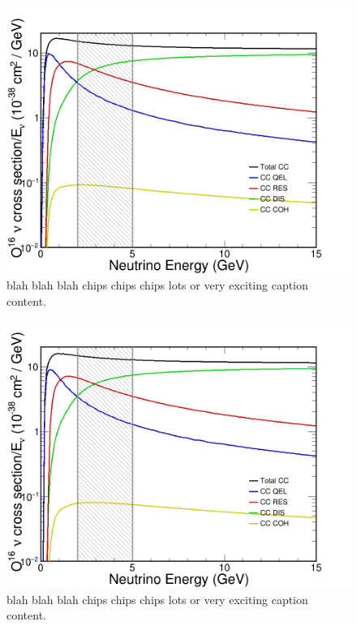 \begin{figure}
    \includegraphics[width=\largefigwidth]{diagrams/cvn/xsec_cc_nu_e_O16}
    \caption[xsec_cc_nu_e_O16]%
    {blah blah blah chips chips chips lots or very exciting caption content.}
    \label{fig:xsec_cc_nu_e_O16}
\end{figure}

\begin{figure}
    \includegraphics[width=\largefigwidth]{diagrams/cvn/xsec_cc_nu_mu_O16}
    \caption[xsec_cc_nu_mu_O16]%
    {blah blah blah chips chips chips lots or very exciting caption content.}
    \label{fig:xsec_cc_nu_mu_O16}
\end{figure}

